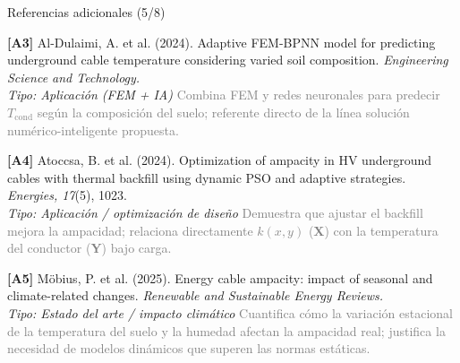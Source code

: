 \documentclass[aspectratio=169]{beamer}
\begin{document}
\begin{frame}{Referencias adicionales (5/8)}
\small\justifying

\textbf{[A3]} Al-Dulaimi, A. et al. (2024). Adaptive FEM-BPNN model for
predicting underground cable temperature considering varied soil composition.
\textit{Engineering Science and Technology.}\\
\textcolor{purple!70!black}{\footnotesize\textit{Tipo: Aplicación (FEM + IA)}} \quad
\textcolor{gray}{\footnotesize Combina FEM y redes neuronales para predecir
$T_{\text{cond}}$ según la composición del suelo; referente directo de la
línea solución numérico-inteligente propuesta.}

\medskip
\textbf{[A4]} Atoccsa, B. et al. (2024). Optimization of ampacity in HV
underground cables with thermal backfill using dynamic PSO and adaptive
strategies. \textit{Energies, 17}(5), 1023.\\
\textcolor{purple!70!black}{\footnotesize\textit{Tipo: Aplicación / optimización de diseño}} \quad
\textcolor{gray}{\footnotesize Demuestra que ajustar el backfill mejora la
ampacidad; relaciona directamente $k(x,y)$ (\textbf{X}) con la temperatura
del conductor (\textbf{Y}) bajo carga.}

\medskip
\textbf{[A5]} Möbius, P. et al. (2025). Energy cable ampacity: impact of
seasonal and climate-related changes. \textit{Renewable and Sustainable Energy
Reviews.}\\
\textcolor{purple!70!black}{\footnotesize\textit{Tipo: Estado del arte / impacto climático}} \quad
\textcolor{gray}{\footnotesize Cuantifica cómo la variación estacional de la
temperatura del suelo y la humedad afectan la ampacidad real; justifica la
necesidad de modelos dinámicos que superen las normas estáticas.}
\end{frame}
\end{document}
